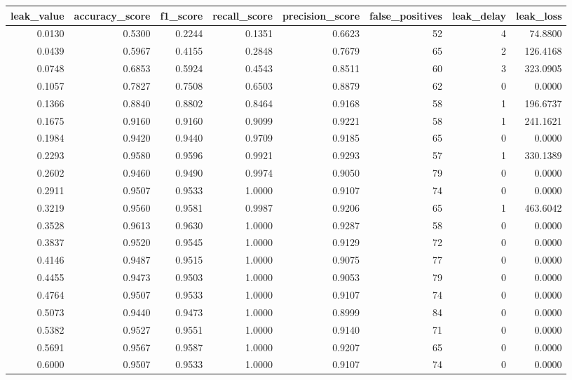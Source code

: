 \begin{tabular}{rrrrrrrr}
\toprule
leak\_value & accuracy\_score & f1\_score & recall\_score & precision\_score & false\_positives & leak\_delay & leak\_loss \\
\midrule
0.0130 & 0.5300 & 0.2244 & 0.1351 & 0.6623 & 52 & 4 & 74.8800 \\
0.0439 & 0.5967 & 0.4155 & 0.2848 & 0.7679 & 65 & 2 & 126.4168 \\
0.0748 & 0.6853 & 0.5924 & 0.4543 & 0.8511 & 60 & 3 & 323.0905 \\
0.1057 & 0.7827 & 0.7508 & 0.6503 & 0.8879 & 62 & 0 & 0.0000 \\
0.1366 & 0.8840 & 0.8802 & 0.8464 & 0.9168 & 58 & 1 & 196.6737 \\
0.1675 & 0.9160 & 0.9160 & 0.9099 & 0.9221 & 58 & 1 & 241.1621 \\
0.1984 & 0.9420 & 0.9440 & 0.9709 & 0.9185 & 65 & 0 & 0.0000 \\
0.2293 & 0.9580 & 0.9596 & 0.9921 & 0.9293 & 57 & 1 & 330.1389 \\
0.2602 & 0.9460 & 0.9490 & 0.9974 & 0.9050 & 79 & 0 & 0.0000 \\
0.2911 & 0.9507 & 0.9533 & 1.0000 & 0.9107 & 74 & 0 & 0.0000 \\
0.3219 & 0.9560 & 0.9581 & 0.9987 & 0.9206 & 65 & 1 & 463.6042 \\
0.3528 & 0.9613 & 0.9630 & 1.0000 & 0.9287 & 58 & 0 & 0.0000 \\
0.3837 & 0.9520 & 0.9545 & 1.0000 & 0.9129 & 72 & 0 & 0.0000 \\
0.4146 & 0.9487 & 0.9515 & 1.0000 & 0.9075 & 77 & 0 & 0.0000 \\
0.4455 & 0.9473 & 0.9503 & 1.0000 & 0.9053 & 79 & 0 & 0.0000 \\
0.4764 & 0.9507 & 0.9533 & 1.0000 & 0.9107 & 74 & 0 & 0.0000 \\
0.5073 & 0.9440 & 0.9473 & 1.0000 & 0.8999 & 84 & 0 & 0.0000 \\
0.5382 & 0.9527 & 0.9551 & 1.0000 & 0.9140 & 71 & 0 & 0.0000 \\
0.5691 & 0.9567 & 0.9587 & 1.0000 & 0.9207 & 65 & 0 & 0.0000 \\
0.6000 & 0.9507 & 0.9533 & 1.0000 & 0.9107 & 74 & 0 & 0.0000 \\
\bottomrule
\end{tabular}
